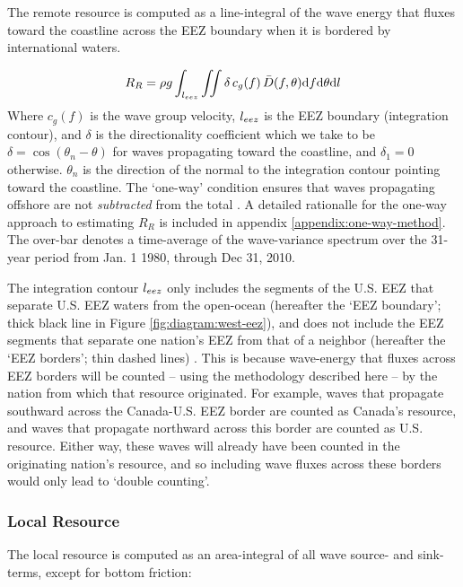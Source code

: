 The remote resource is computed as a line-integral of the wave energy that fluxes toward the coastline across the EEZ boundary when it is bordered by international waters. 

\begin{align}
  R_R = \rho g \int_{l_{eez}}\iint \delta \, c_g(f) \, \bar{D}(f,\theta) \mathrm{d} f \mathrm{d} \theta \mathrm{d} l
\label{eqn:RR}
\end{align}
Where $c_g(f)$ is the wave group velocity, $l_{eez}$ is the EEZ boundary (integration contour), and $\delta$ is the directionality coefficient which we take to be $\delta = \cos(\theta_n - \theta)$ for waves propagating toward the coastline, and $\delta_1 = 0$ otherwise. $\theta_n$ is the direction of the normal to the integration contour pointing toward the coastline. The `one-way' condition ensures that waves propagating offshore are not {\em subtracted} from the total \citep[]{gunnQuantifyingGlobalWave2012}. A detailed rationalle for the one-way approach to estimating $R_R$ is included in appendix \ref{appendix:one-way-method}. The over-bar denotes a time-average of the wave-variance spectrum over the 31-year period from Jan. 1 1980, through Dec 31, 2010.

The integration contour $l_{eez}$ only includes the segments of the U.S. EEZ that separate U.S. EEZ waters from the open-ocean (hereafter the `EEZ boundary'; thick black line in Figure \ref{fig:diagram:west-eez}), and does not include the EEZ segments that separate one nation's EEZ from that of a neighbor (hereafter the `EEZ borders'; thin dashed lines) \citep[]{flandersmarineinstituteMaritimeBoundariesGeodatabase2018}. This is because wave-energy that fluxes across EEZ borders will be counted -- using the methodology described here -- by the nation from which that resource originated. For example, waves that propagate southward across the Canada-U.S. EEZ border are counted as Canada's resource, and waves that propagate northward across this border are counted as U.S. resource. Either way, these waves will already have been counted in the originating nation's resource, and so including wave fluxes across these borders would only lead to `double counting'.


\subsubsection{Local Resource} \label{sec:method:calc:local}

The local resource is computed as an area-integral of all wave source- and sink-terms, except for bottom friction:

